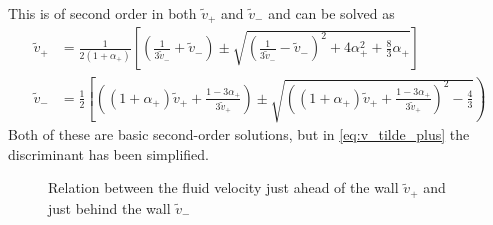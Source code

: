 This is of second order in both $\tilde{v}_+$ and $\tilde{v}_-$ and can be solved as \cite[eq. B.6, B.7]{hindmarsh_gw_pt_2019}
\begin{align}
\tilde{v}_+ &= \frac{1}{2(1+\alpha_+)}\left[ \left(\frac{1}{3\tilde{v}_-}+\tilde{v}_-\right) \pm \sqrt{\left(\frac{1}{3\tilde{v}_-} - \tilde{v}_- \right)^2 + 4\alpha_+^2 + \frac{8}{3} \alpha_+} \right]
\label{eq:v_tilde_plus}
\\
\tilde{v}_- &= \frac{1}{2} \left[ \left( (1+\alpha_+)\tilde{v}_+ + \frac{1-3\alpha_+}{3\tilde{v}_+} \right) \pm \sqrt{\left((1+\alpha_+)\tilde{v}_+ + \frac{1-3\alpha_+}{3\tilde{v}_+} \right)^2 - \frac{4}{3}} \right)
\label{eq:v_tilde_minus}
\end{align}
Both of these are basic second-order solutions, but in \eqref{eq:v_tilde_plus} the discriminant has been simplified.

\begin{figure}[h!]
\centering
{}
\caption{Relation between the fluid velocity just ahead of the wall $\tilde{v}_+$ and just behind the wall $\tilde{v}_-$ \cite[fig. 13]{lecture_notes}}
\label{fig:vplus_vminus}
\end{figure}

